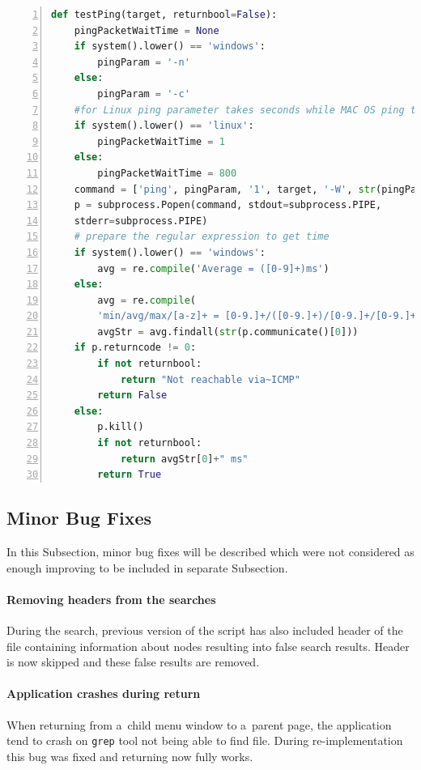 {{{{{{{\noindent\begin{minipage}{\linewidth}
		\begin{lstlisting}[language=Python, numbers=left, label={lst:testping}, caption={Example of fully multi-platform function testPing.}, frame=single, showstringspaces=false, breaklines=true, keywordstyle=\color{blue},captionpos=b]
def testPing(target, returnbool=False):
	pingPacketWaitTime = None
	if system().lower() == 'windows':
		pingParam = '-n'
	else:
		pingParam = '-c'
	#for Linux ping parameter takes seconds while MAC OS ping takes miliseconds
	if system().lower() == 'linux':
		pingPacketWaitTime = 1
	else:
		pingPacketWaitTime = 800
	command = ['ping', pingParam, '1', target, '-W', str(pingPacketWaitTime)]
	p = subprocess.Popen(command, stdout=subprocess.PIPE,
	stderr=subprocess.PIPE)
	# prepare the regular expression to get time
	if system().lower() == 'windows':
		avg = re.compile('Average = ([0-9]+)ms')
	else:
		avg = re.compile(
		'min/avg/max/[a-z]+ = [0-9.]+/([0-9.]+)/[0-9.]+/[0-9.]+')
		avgStr = avg.findall(str(p.communicate()[0]))
	if p.returncode != 0:
		if not returnbool:
			return "Not reachable via~ICMP"
		return False
	else:
		p.kill()
		if not returnbool:
			return avgStr[0]+" ms"
		return True
		\end{lstlisting}
	\end{minipage}

\subsection{Minor Bug Fixes}
In this Subsection, minor bug fixes will be described which were not considered as enough improving to be included in separate Subsection. 
\paragraph{Removing headers from the searches}
During the search, previous version of the script has also included header of the file containing information about nodes resulting into false search results. Header is now skipped and these false results are removed.
\paragraph{Application crashes during return}
When returning from a~child menu window to a~parent page, the application tend to crash on \texttt{grep} tool not being able to find file. During re-implementation this bug was fixed and returning now fully works.

}}}}}}}

